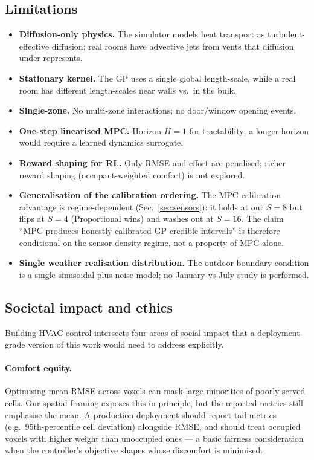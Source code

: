 \documentclass[11pt,letterpaper]{article}
\begin{document}
\subsection{Limitations}

\begin{itemize}
\itemsep0pt
\item \textbf{Diffusion-only physics.} The simulator models heat transport
      as turbulent-effective diffusion; real rooms have advective jets
      from vents that diffusion under-represents.
\item \textbf{Stationary kernel.} The GP uses a single global length-scale,
      while a real room has different length-scales near walls vs.\ in
      the bulk.
\item \textbf{Single-zone.} No multi-zone interactions; no door/window
      opening events.
\item \textbf{One-step linearised MPC.} Horizon $H = 1$ for tractability;
      a longer horizon would require a learned dynamics surrogate.
\item \textbf{Reward shaping for RL.} Only RMSE and effort are penalised;
      richer reward shaping (occupant-weighted comfort) is not explored.
\item \textbf{Generalisation of the calibration ordering.} The MPC
      calibration advantage is regime-dependent (Sec.~\ref{sec:sensors}):
      it holds at our $S = 8$ but flips at $S = 4$ (Proportional wins)
      and washes out at $S = 16$. The claim ``MPC produces honestly
      calibrated GP credible intervals'' is therefore conditional on the
      sensor-density regime, not a property of MPC alone.
\item \textbf{Single weather realisation distribution.} The outdoor
      boundary condition is a single sinusoidal-plus-noise model; no
      January-vs-July study is performed.
\end{itemize}

\subsection{Societal impact and ethics}
\label{sec:ethics}

Building HVAC control intersects four areas of social impact that a
deployment-grade version of this work would need to address explicitly.

\paragraph{Comfort equity.} Optimising mean RMSE across voxels can
mask large minorities of poorly-served cells. Our spatial framing
exposes this in principle, but the reported metrics still emphasise
the mean. A production deployment should report tail metrics (e.g.\
95th-percentile cell deviation) alongside RMSE, and should treat
occupied voxels with higher weight than unoccupied ones --- a basic
fairness consideration when the controller's objective shapes whose
discomfort is minimised.
\end{document}
